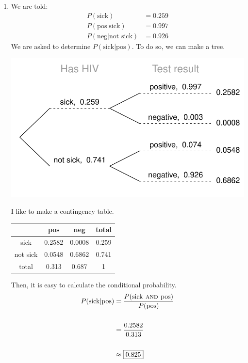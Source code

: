 \documentclass[12pt,letterpaper]{article}
\begin{document}
\begin{enumerate}
\newpage
\newcommand{\sick}{\text{sick}}
\newcommand{\nsick}{\text{not sick}}
\newcommand{\pos}{\text{pos}}
\newcommand{\nega}{\text{neg}}
\item We are told:
\begin{align*}
P(\sick) &= 0.259 \\
P(\pos|\sick) &= 0.997 \\
P(\nega|\nsick) &= 0.926
\end{align*}
We are asked to determine $P(\sick|\pos)$. To do so, we can make a tree.
\begin{center}
\includegraphics[scale=0.8]{figures/hiv.pdf}
\end{center}
I like to make a contingency table.
\begin{center}
\begin{tabular}{c | c c | c} 
         & pos    & neg    & total \\ \hline
sick     & 0.2582 & 0.0008 & 0.259 \\
not sick & 0.0548 & 0.6862 & 0.741 \\ \hline 
total    & 0.313  & 0.687  & 1 
\end{tabular}
\end{center}
Then, it is easy to calculate the conditional probability.
\begin{align*}
P(\text{sick}|\text{pos}) &= \frac{P(\text{sick} \textsc{~and~} \text{pos})}{P(\text{pos})} \\\\
&= \frac{0.2582}{0.313} \\\\
&\approx \fbox{0.825}
\end{align*}

\newpage


\end{enumerate}
\end{document}
